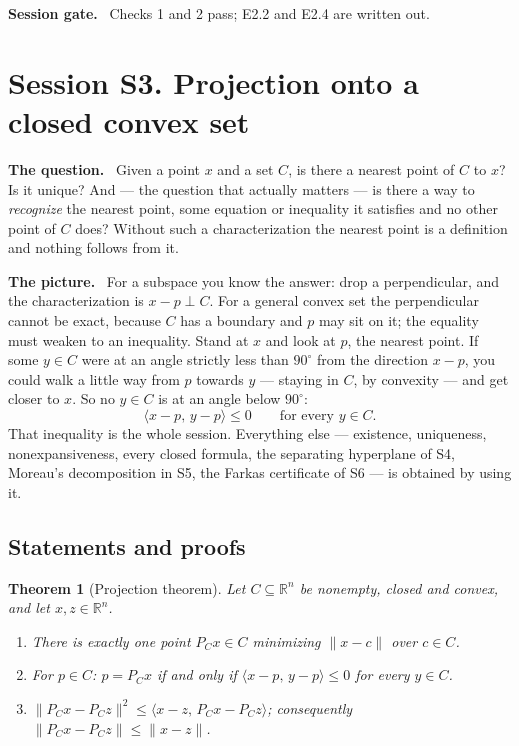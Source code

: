 \documentclass[11pt,a4paper]{article}
\newcommand{\mpart}[1]{\smallskip\noindent\textbf{#1}\ \ignorespaces}
\theoremstyle{definition}
\theoremstyle{plain}
\newtheorem{theorem}{Theorem}
\theoremstyle{remark}
\newcommand{\R}{\mathbb{R}}
\newcommand{\ip}[2]{\langle #1,\, #2\rangle}
\newcommand{\norm}[1]{\lVert #1\rVert}
\newcommand{\proj}{P}
\begin{document}
\mpart{Session gate.} Checks 1 and 2 pass; E2.2 and E2.4 are written out.

\clearpage

\section{Session S3. Projection onto a closed convex set}

\mpart{The question.} Given a point $x$ and a set $C$, is there a nearest point of $C$ to $x$?
Is it unique? And --- the question that actually matters --- is there a way to \emph{recognize}
the nearest point, some equation or inequality it satisfies and no other point of $C$ does?
Without such a characterization the nearest point is a definition and nothing follows from it.

\mpart{The picture.} For a subspace you know the answer: drop a perpendicular, and the
characterization is $x-p\perp C$. For a general convex set the perpendicular cannot be exact,
because $C$ has a boundary and $p$ may sit on it; the equality must weaken to an inequality.
Stand at $x$ and look at $p$, the nearest point. If some $y\in C$ were at an angle strictly less
than $90^\circ$ from the direction $x-p$, you could walk a little way from $p$ towards $y$ ---
staying in $C$, by convexity --- and get closer to $x$. So no $y\in C$ is at an angle below
$90^\circ$:
\[
\ip{x-p}{y-p}\le0\qquad\text{for every }y\in C .
\]
That inequality is the whole session. Everything else --- existence, uniqueness,
nonexpansiveness, every closed formula, the separating hyperplane of S4, Moreau's decomposition
in S5, the Farkas certificate of S6 --- is obtained by using it.

\subsection*{Statements and proofs}

\begin{theorem}[Projection theorem]
\label{thm:proj}
Let $C\subseteq\R^n$ be nonempty, closed and convex, and let $x,z\in\R^n$.
\begin{enumerate}
\item There is exactly one point $\proj_Cx\in C$ minimizing $\norm{x-c}$ over $c\in C$.
\item For $p\in C$: $p=\proj_Cx$ if and only if $\ip{x-p}{y-p}\le0$ for every $y\in C$.
\item $\norm{\proj_Cx-\proj_Cz}^2\le\ip{x-z}{\proj_Cx-\proj_Cz}$; consequently
$\norm{\proj_Cx-\proj_Cz}\le\norm{x-z}$.
\end{enumerate}
\end{theorem}
\end{document}
